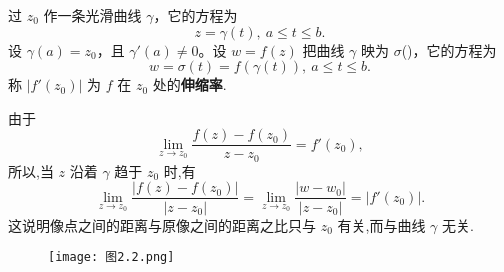 \documentclass[../../main.tex]{subfiles}
\begin{document}
\begin{definition}[伸缩率]
过 \( z_0 \) 作一条光滑曲线 \( \gamma \)，它的方程为  
\[ z = \gamma(t),\ a \leqslant t \leqslant b. \]  
设 \( \gamma(a) = z_0 \)，且 \( \gamma'(a) \neq 0 \)。设 \( w = f(z) \) 把曲线 \( \gamma \) 映为 \( \sigma \)()，它的方程为  
\[ w = \sigma(t) = f(\gamma(t)),\ a \leqslant t \leqslant b. \] 
称 \( |f'(z_0)| \) 为 \( f \) 在 \( z_0 \) 处的\textbf{伸缩率}.
\end{definition}
\begin{note}
由于
\[
\lim_{z \to z_0} \frac{f(z) - f(z_0)}{z - z_0} = f'(z_0),
\]
所以,当 \( z \) 沿着 \( \gamma \) 趋于 \( z_0 \) 时,有
\[
\lim_{z \to z_0} \frac{|f(z) - f(z_0)|}{|z - z_0|} = \lim_{z \to z_0} \frac{|w - w_0|}{|z - z_0|} = |f'(z_0)|.
\]
这说明像点之间的距离与原像之间的距离之比只与 \( z_0 \) 有关,而与曲线 \( \gamma \) 无关. 
\end{note}

\begin{figure}[H]
\centering
\texttt{[image: 
图2.2.png]}
\caption{}
\label{figure:image-图2.2}
\end{figure}
\end{document}
